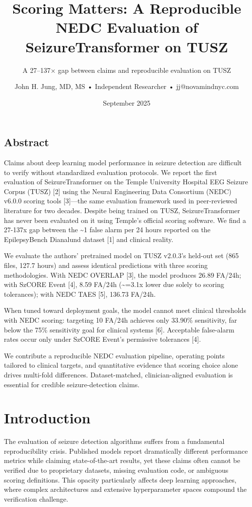 \documentclass[
]{article}
\title{Scoring Matters: A Reproducible NEDC Evaluation of
SeizureTransformer on TUSZ}
\subtitle{A 27--137× gap between claims and reproducible evaluation on
TUSZ}
\author{John H. Jung, MD, MS • Independent Researcher •
jj@novamindnyc.com}
\date{September 2025}
\begin{document}
\maketitle

\hypertarget{abstract}{%
\subsection{Abstract}\label{abstract}}

Claims about deep learning model performance in seizure detection are
difficult to verify without standardized evaluation protocols. We report
the first evaluation of SeizureTransformer on the Temple University
Hospital EEG Seizure Corpus (TUSZ) {[}2{]} using the Neural Engineering
Data Consortium (NEDC) v6.0.0 scoring tools {[}3{]}---the same
evaluation framework used in peer-reviewed literature for two decades.
Despite being trained on TUSZ, SeizureTransformer has never been
evaluated on it using Temple's official scoring software. We find a
27-137x gap between the \textasciitilde1 false alarm per 24 hours
reported on the EpilepsyBench Dianalund dataset {[}1{]} and clinical
reality.

We evaluate the authors' pretrained model on TUSZ v2.0.3's held-out set
(865 files, 127.7 hours) and assess identical predictions with three
scoring methodologies. With NEDC OVERLAP {[}3{]}, the model produces
26.89 FA/24h; with SzCORE Event {[}4{]}, 8.59 FA/24h
(\textasciitilde=3.1x lower due solely to scoring tolerances); with NEDC
TAES {[}5{]}, 136.73 FA/24h.

When tuned toward deployment goals, the model cannot meet clinical
thresholds with NEDC scoring: targeting 10 FA/24h achieves only 33.90\%
sensitivity, far below the 75\% sensitivity goal for clinical systems
{[}6{]}. Acceptable false-alarm rates occur only under SzCORE Event's
permissive tolerances {[}4{]}.

We contribute a reproducible NEDC evaluation pipeline, operating points
tailored to clinical targets, and quantitative evidence that scoring
choice alone drives multi-fold differences. Dataset-matched,
clinician-aligned evaluation is essential for credible seizure-detection
claims.

\hypertarget{introduction}{%
\section{Introduction}\label{introduction}}

The evaluation of seizure detection algorithms suffers from a
fundamental reproducibility crisis. Published models report dramatically
different performance metrics while claiming state-of-the-art results,
yet these claims often cannot be verified due to proprietary datasets,
missing evaluation code, or ambiguous scoring definitions. This opacity
particularly affects deep learning approaches, where complex
architectures and extensive hyperparameter spaces compound the
verification challenge.
\end{document}

